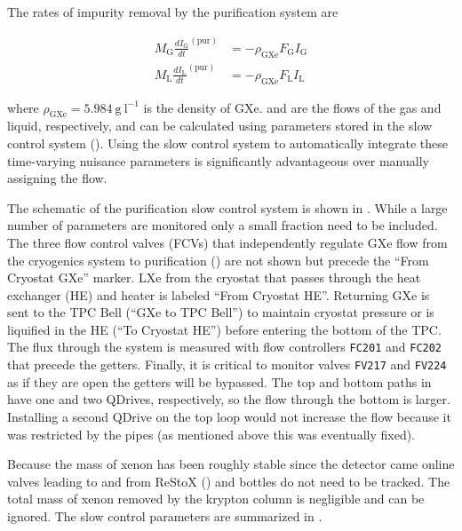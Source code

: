 The rates of impurity removal by the purification system are

\begin{subequations}
\begin{align}
M_{\mathrm{G}} \frac{dI_{\mathrm{G}}}{dt}^{(\mathrm{pur})} &= -\rho_{\mathrm{GXe}} F_{\mathrm{G}} I_{\mathrm{G}}
\label{eq:electron_lifetime_model_removal_gxe}
\\
M_{\mathrm{L}} \frac{dI_{\mathrm{L}}}{dt}^{(\mathrm{pur})} &= -\rho_{\mathrm{GXe}} F_{\mathrm{L}} I_{\mathrm{L}}
\label{eq:electron_lifetime_model_removal_lxe}
\end{align}
\end{subequations}

\noindent where $\rho_{\mathrm{GXe}} = 5.984\ \mathrm{g\ l^{-1}}$ is the density of GXe.  \fg and \fl are the flows of the
gas and liquid, respectively, and can be calculated using parameters stored in the slow control system
().  Using the slow control system to automatically integrate these time-varying nuisance
parameters is significantly advantageous over manually assigning the flow.

The schematic of the purification slow control system is shown in .  While a large
number of parameters are monitored only a small fraction need to be included.  The three flow control valves (FCVs) that independently
regulate GXe flow from the cryogenics system to purification () are not shown but precede the
``From Cryostat GXe'' marker.  LXe from the cryostat that passes
through the heat exchanger (HE) and heater is labeled ``From Cryostat HE''.  Returning GXe is sent to the TPC Bell (``GXe to TPC Bell'')
to maintain cryostat pressure or is liquified in the HE (``To Cryostat HE'') before entering the bottom of the TPC.  The flux through the
system is
measured with flow controllers \texttt{FC201} and \texttt{FC202} that precede the getters.  Finally, it is critical to monitor valves
\texttt{FV217} and \texttt{FV224} as
if they are open the getters will be bypassed.  The top and bottom paths in  have one
and two QDrives, respectively, so the flow through the bottom is larger.  Installing a second QDrive on the top loop would not
increase the flow because it was restricted by the pipes (as mentioned above this was eventually fixed).

Because the mass of xenon has
been roughly stable since the detector came online valves
leading to and from ReStoX () and bottles do not need to be tracked.  The total mass of xenon removed by the
krypton column is negligible and
can be ignored.  The slow control parameters are summarized in .

